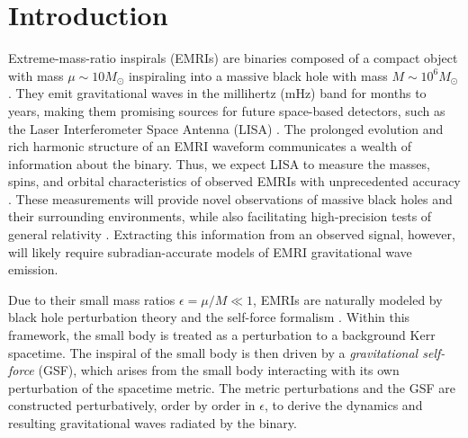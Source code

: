 \documentclass[%
 reprint,
 nofootinbib,
 amsmath,amssymb,
 aps,
 prd,
]{revtex4-2}
\begin{document}
\section{Introduction}
\label{sec:intro}

Extreme-mass-ratio inspirals (EMRIs) are binaries composed of a compact object with mass $\mu \sim 10 M_\odot$ inspiraling into a massive black hole with mass $M \sim 10^6 M_\odot$. They emit gravitational waves in the millihertz (mHz) band for months to years, making them promising sources for future space-based detectors, such as the Laser Interferometer Space Antenna (LISA) \cite{NASA11, ESA12}. The prolonged evolution and rich harmonic structure of an EMRI waveform communicates a wealth of information about the binary. Thus, we expect LISA to measure the masses, spins, and orbital characteristics of observed EMRIs with unprecedented accuracy \cite{BabaETC17}. These measurements will provide novel observations of massive black holes and their surrounding environments, while also facilitating high-precision tests of general relativity \cite{BerrETC19}. Extracting this information from an observed signal, however, will likely require subradian-accurate models of EMRI gravitational wave emission. 

Due to their small mass ratios $\epsilon = \mu/M \ll 1$, EMRIs are naturally modeled by black hole perturbation theory and the self-force formalism \cite{PounWard20}. Within this framework, the small body is treated as a perturbation to a background Kerr spacetime. The inspiral of the small body is then driven by a \emph{gravitational self-force} (GSF), which arises from the small body interacting with its own perturbation of the spacetime metric. The metric perturbations and the GSF are constructed perturbatively, order by order in $\epsilon$, to derive the dynamics and resulting gravitational waves radiated by the binary. 
\end{document}
